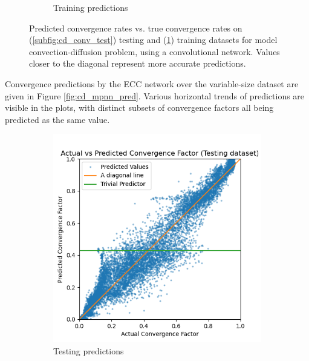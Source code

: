 \documentclass{siamart190516}
\begin{document}
\begin{figure}[h]
\begin{subfigure}{.48\textwidth}
    \caption{Training predictions}
    \label{subfig:cd_conv_train}
  \end{subfigure}
  \caption{Predicted convergence rates vs. true convergence rates on (\ref{subfig:cd_conv_test}) testing and (\ref{subfig:cd_conv_train}) training datasets for model convection-diffusion problem, using a convolutional network. Values closer to the diagonal represent more accurate predictions. }
  \label{fig:cd_conv_pred}
\end{figure}

Convergence predictions by the ECC network over the variable-size dataset are given in Figure \ref{fig:cd_mpnn_pred}.  Various horizontal trends of predictions are visible in the plots, with distinct subsets of convergence factors all being predicted as the same value.

\begin{figure}[h]
  \centering
  \begin{subfigure}{.48\textwidth}
    \includegraphics[width=\textwidth]{figs/cd_var_conv_mpnn_test_pred.png}
    \caption{Testing predictions}
    \label{subfig:cd_mpnn_test}
  \end{subfigure}
  \begin{subfigure}{.48\textwidth}

\end{subfigure}
\end{figure}
\end{document}

